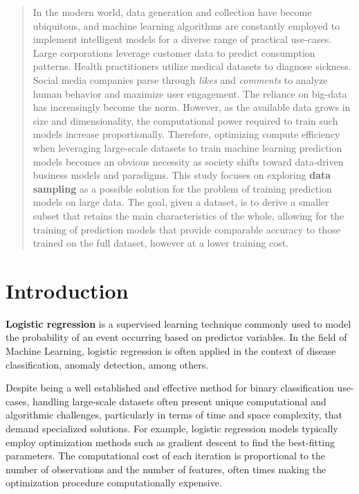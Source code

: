 \documentclass{article}
\theoremstyle{plain}
\theoremstyle{definition}
\theoremstyle{remark}
\begin{document}
\begin{abstract}

In the modern world, data generation and collection have become ubiquitous, and machine learning algorithms are constantly employed to implement intelligent models for a diverse range of practical use-cases. Large corporations leverage customer data to predict consumption patterns. Health practitioners utilize medical datasets to diagnose sickness. Social media companies parse through \textit{likes} and \textit{comments} to analyze human behavior and maximize user engagement. The reliance on big-data has increasingly become the norm. However, as the available data grows in size and dimensionality, the computational power required to train such models increase proportionally. Therefore, optimizing compute efficiency when leveraging large-scale datasets to train machine learning prediction models becomes an obvious necessity as society shifts toward data-driven business models and paradigms. This study focuses on exploring \textbf{data sampling} as a possible solution for the problem of training prediction models on large data. The goal, given a dataset, is to derive a smaller subset that retains the main characteristics of the whole, allowing for the training of prediction models that provide comparable accuracy to those trained on the full dataset, however at a lower training cost.

\end{abstract}

\section{Introduction}

\textbf{Logistic regression} is a supervised learning technique commonly used to model the probability of an event occurring based on predictor variables. In the field of Machine Learning, logistic regression is often applied in the context of disease classification, anomaly detection, among others.

Despite being a well established and effective method for binary classification use-cases, handling large-scale datasets often present unique computational and algorithmic challenges, particularly in terms of time and space complexity, that demand specialized solutions. For example, logistic regression models typically employ optimization methods such as gradient descent to find the best-fitting parameters. The computational cost of each iteration is proportional to the number of observations and the number of features, often times making the optimization procedure computationally expensive.
\end{document}
